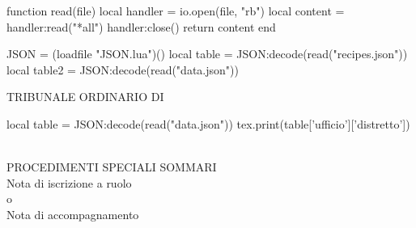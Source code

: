 \documentclass{article}
\begin{document}
\begin{luacode}
function read(file)
    local handler = io.open(file, "rb")
    local content = handler:read("*all")
    handler:close()
    return content
end

JSON = (loadfile "JSON.lua")()
local table = JSON:decode(read("recipes.json"))
local table2 = JSON:decode(read("data.json"))

\end{luacode}


\begin{center}
\LARGE{TRIBUNALE ORDINARIO DI} 
\begin{luacode}
 local table = JSON:decode(read("data.json"))   	  
	  tex.print(table['ufficio']['distretto'])
\end{luacode}
\\
\vspace*{0.5cm}
\normalsize{PROCEDIMENTI SPECIALI SOMMARI}\\
\vspace*{0.5cm}
\LARGE{Nota di iscrizione a ruolo\\
o\\
Nota di accompagnamento}\\
\end{center}



\end{document}

